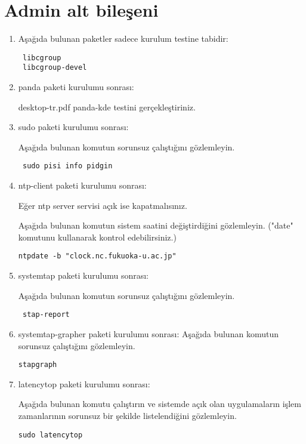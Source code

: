 \documentclass[a4paper,10pt]{article}
\begin{document}
\section{Admin alt bileşeni}
\begin{enumerate}

\item Aşağıda bulunan paketler sadece kurulum testine tabidir:

\begin{verbatim}
 libcgroup
 libcgroup-devel
\end{verbatim}

\item panda paketi kurulumu sonrası:

desktop-tr.pdf panda-kde testini gerçekleştiriniz.

\item sudo paketi kurulumu sonrası:

Aşağıda bulunan komutun sorunsuz çalıştığını gözlemleyin.
\begin{verbatim}
 sudo pisi info pidgin
\end{verbatim}

\item ntp-client paketi kurulumu sonrası:

Eğer ntp server servisi açık ise kapatmalısınız. 

Aşağıda bulunan komutun sistem saatini değiştirdiğini gözlemleyin.  ("date" komutunu kullanarak kontrol edebilirsiniz.)
\begin{verbatim}
ntpdate -b "clock.nc.fukuoka-u.ac.jp" 
\end{verbatim}

\item systemtap paketi kurulumu sonrası:

Aşağıda bulunan komutun sorunsuz çalıştığını gözlemleyin.
\begin{verbatim}
 stap-report
\end{verbatim}

\item systemtap-grapher paketi kurulumu sonrası:
Aşağıda bulunan komutun sorunsuz çalıştığını gözlemleyin.
\begin{verbatim}
stapgraph
\end{verbatim}


\item latencytop paketi kurulumu sonrası:

Aşağıda bulunan komutu çalıştırın ve sistemde açık olan uygulamaların işlem zamanlarının sorunsuz bir şekilde listelendiğini gözlemleyin.
\begin{verbatim}
sudo latencytop 
\end{verbatim}


\end{enumerate}
\end{document}
